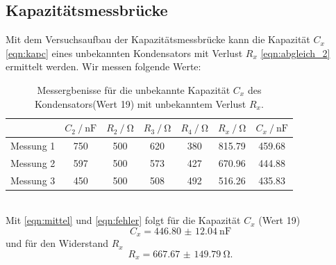 \subsection{Kapazitätsmessbrücke}
Mit dem Versuchsaufbau der Kapazitätsmessbrücke kann die Kapazität $C_x$ \eqref{eqn:kapc}
eines unbekannten Kondensators mit Verlust $R_x$ \eqref{eqn:abgleich_2} ermittelt werden.
Wir messen folgende Werte:
\begin{table}
  \centering
  \label{tab:b_19}
  \begin{tabular}{c|cccccc}
    \toprule
    & {$C_2 \:/\: \si{\nano \farad}$} & {$R_2\:/\: \si{\ohm}$} & {$R_3\:/\: \si{\ohm}$} & {$R_4\:/\: \si{\ohm}$} & {$R_x\:/\: \si{\ohm}$} & {$C_x \:/\: \si{\nano\farad}$} \\
    \midrule
    {Messung 1} & 750 & 500 & 620 & 380 & 815.79 & 459.68\\
    {Messung 2} & 597 & 500 & 573 & 427 & 670.96 & 444.88\\
    {Messung 3} & 450 & 500 & 508 & 492 & 516.26 & 435.83\\
    \bottomrule
  \end{tabular}
  \caption{Messergbenisse für die unbekannte Kapazität $C_x$ des Kondensators(Wert 19) mit unbekanntem Verlust $R_x$.}
\end{table}
\\
Mit \eqref{eqn:mittel} und \eqref{eqn:fehler} folgt für die Kapazität $C_x$ (Wert 19)
\begin{equation*}
 C_x = \SI{446.80(1204)}{\nano \farad}
\end{equation*}
und für den Widerstand $R_x$
\begin{equation*}
  R_x = \SI{667.67(14979)}{\ohm}.
\end{equation*}
